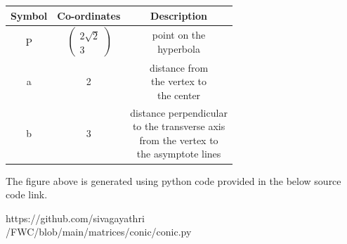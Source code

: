 \documentclass[a4paper,10pt]{report}
\begin{document}
\begin{multicols}{2}
\begin{center}
\renewcommand{\arraystretch}{1.25}
    \begin{tabular}{|c|c|c|}
    \hline %
      \large\textbf{Symbol} & \large\textbf{Co-ordinates} & \large\textbf{Description}\\
      \hline
	    \large P & $\ \begin{pmatrix} 2\sqrt{2} \\ 3 \end{pmatrix}$ & \makecell {point on the \\ hyperbola} \\

	\large a & 2 &\makecell {distance from \\ the  vertex to \\ the center}\\
	\large b & 3 &\makecell {distance perpendicular \\ to the transverse axis \\ from the vertex to \\ the asymptote lines }\\
      \hline
   \end{tabular}
 \end{center}
\raggedright\large{The figure above is generated using python code provided in the below source code link.} \\
\begin{mdframed}
\raggedright\large{https://github.com/sivagayathri \\ /FWC/blob/main/matrices/conic/conic.py}
\end{mdframed}
\end{multicols}
\end{document}
